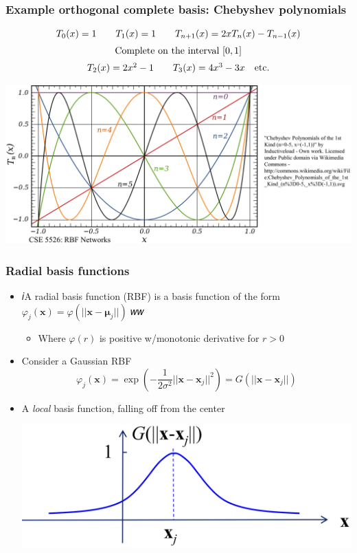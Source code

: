 \documentclass[12pt,notes,mathserif]{beamer}
\begin{document}
\begin{frame}[c]
	\frametitle{Example orthogonal complete basis: Chebyshev polynomials}
	\begin{equation*}
		\begin{array}{c}
			T_0(x)=1\qquad
			T_1(x)=1\qquad
			T_{n+1}(x)=2xT_n(x)-T_{n-1}(x)       \\[2mm]
			{\rm Complete~on~the~interval}~[0,1] \\[2mm]
			T_2(x)=2x^2-1\qquad
			T_3(x)=4x^3-3x\quad {\rm etc.}
		\end{array}
	\end{equation*}
	\begin{center}
		\includegraphics[width=0.85\linewidth]{fig/lec79.jpg}
	\end{center}
\end{frame}

\begin{frame}[c]
	\frametitle{Radial basis functions}
	\begin{itemize}
		\item 𝑖A radial basis function (RBF) is a basis function of the form $\varphi_j(\mathbf{x})=\varphi(||\mathbf{x}-\mathbf{\mu}_j||)$
		      𝑤𝑤
		      \begin{itemize}
			      \item Where $\varphi(r)$ is positive w/monotonic derivative for $r> 0$
		      \end{itemize}
		\item Consider a Gaussian RBF
		      \[
			      \varphi_j(\mathbf{x})=\exp\left(-\dfrac{1}{2\sigma^2}||\mathbf{x}-\mathbf{x}_j||^2\right)=G(||\mathbf{x}-\mathbf{x}_j||)
		      \]
		\item A \textit{local} basis function, falling off from the center
		      \begin{center}
			      \includegraphics[width=0.85\linewidth]{fig/lec710.jpg}
		      \end{center}
	\end{itemize}
\end{frame}
\end{document}
